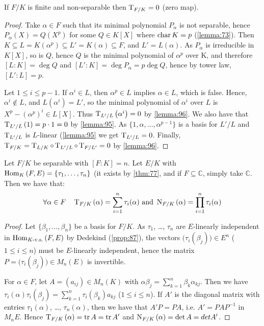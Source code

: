 \begin{proposition}
  \label{prop:97}
  If $F/K$ is finite and non-separable then $\traceop_{F/K} = 0$ (zero map).
\end{proposition}

\begin{proof}
  Take $\alpha \in F$ such that its minimal polynomial $P_\alpha$ is not separable, hence $P_\alpha(X) = Q(X^p)$ for some $Q \in K[X]$ where $\mchar K = p$ (\autoref{lemma:73}). Then $K \subseteq L = K(\alpha^p) \subseteq L' = K(\alpha) \subseteq F$, and $L' = L(\alpha)$. As $P_\alpha$ is irreducible in $K[X]$, so is $Q$, hence $Q$ is the minimal polynomial of $\alpha^p$ over K, and therefore $[L : K] = \deg Q$ and $[L' : K] = \deg P_\alpha = p  \deg Q$, hence by tower law, $[L' : L] = p$.

Let $1 \leq i \leq p-1$. If $\alpha^i \in L$, then $\alpha^p \in L$ implies $\alpha \in L$, which is false. Hence, $\alpha^i \notin L$, and $L(\alpha^i) = L'$, so the minimal polynomial of $\alpha^i$ over $L$ is $X^p - (\alpha^p)^i \in L[X]$. Thus $\trace{L'/L}{\alpha^i} = 0$ by \autoref{lemma:96}. We also have that $\trace{L'/L}{1} = p\cdot{}1 = 0$ by \autoref{lemma:95}. As $\{ 1 , \alpha, \dotsc, \alpha^{p-1} \}$ is a basis for $L'/L$ and $\traceop_{L'/L}$ is $L$-linear (\autoref{lemma:95} we get $\traceop_{L'/L} = 0$. Finally, $\traceop_{F/K} = \traceop_{L/K} \circ \traceop_{L'/L} \circ \traceop_{F/L'} = 0$ by \autoref{lemma:96}.
\end{proof}

\begin{proposition}
  \label{prop:98}
  Let $F/K$ be separable with $[F : K] = n$. Let $E/K$ with $\homset{F}{E} = \{ \tau_1, \dotsc, \tau_n \}$ (it exists by \autoref{thm:77}, and if $F \subseteq \mathbb{C}$, simply take $\mathbb{C}$. Then we have that:
\[
\forall \alpha \in F \quad \trace{F/K}{\alpha} = \sum_{i=1}^n \tau_i(\alpha) \text{ and } \norm{F/K}{\alpha} = \prod_{i=1}^n \tau_i(\alpha)
\]
\end{proposition}

\begin{proof}
  Let $\{ \beta_1, \dotsc, \beta_n \}$ be a basis for $F/K$. As $\tau_1$, \ldots, $\tau_n$ are $E$-linearly independent in $\homset[K\text{-v.s.}]{F}{E}$ by Dedekind (\autoref{prop:87}), the vectors $\big(\tau_i(\beta_j)\big) \in E^n$ ($1 \leq i \leq n$) must be $E$-linearly independent, hence the matrix $P = \big(\tau_i(\beta_j)\big) \in M_n(E)$ is invertible.

For $\alpha \in F$, let $A = (a_{ij}) \in M_n(K)$ with $\alpha\beta_j = \sum_{k=1}^n \beta_k\alpha_{kj}$. Then we have $\tau_i(\alpha)\tau_i(\beta_j) = \sum_{k=1}^n \tau_i(\beta_k)a_{kj}$ ($1 \leq i \leq n$). If $A'$ is the diagonal matrix with entries $\tau_1(\alpha)$, \ldots, $\tau_n(\alpha)$, then we have that $A'P = PA$, i.e. $A' = PAP^{-1}$ in $M_n{E}$. Hence $\trace{F/K}{\alpha} = \matTr A = \matTr A'$ and $\norm{F/K}{\alpha} = \det A = det A'$.
\end{proof}


